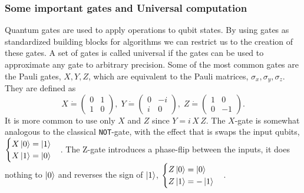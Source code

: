 \subsubsection{Some important gates and Universal computation}
Quantum gates are used to apply operations to qubit states. By using gates as standardized building blocks for algorithms we can restrict us to the creation of these gates. A set of gates is called universal if the gates can be used to approximate any gate to arbitrary precision. Some of the most common gates are the Pauli gates, $X, Y, Z$, which are equivalent to the Pauli matrices, $\sigma_x,\sigma_y,\sigma_z$. 
They are defined as
\begin{equation}
X \dot{=}\begin{pmatrix}
0 & 1 \\ 1 & 0
\end{pmatrix},\; 
Y\dot{=}\begin{pmatrix}
0 & -i \\ i & 0
\end{pmatrix},\; 
Z \dot{=} \begin{pmatrix}
1 & 0 \\ 0 & -1
\end{pmatrix}.
\end{equation}
It is more common to use only $X$ and $Z$ since $Y = i\,X\,Z$. The $X$-gate is somewhat analogous to the classical {\tt NOT}-gate,  
with the effect that is swaps the input qubits, 
$\begin{cases} X\ket{0} = \ket{1}\\
X\ket{1} = \ket{0}
\end{cases}$.
The Z-gate introduces a phase-flip between the inputs, it does nothing to $\ket{0}$ and reverses the sign of $\ket{1}$, $\begin{cases} Z\ket{0} = \ket{0}\\
Z\ket{1} = -\ket{1}
\end{cases}$.
 
